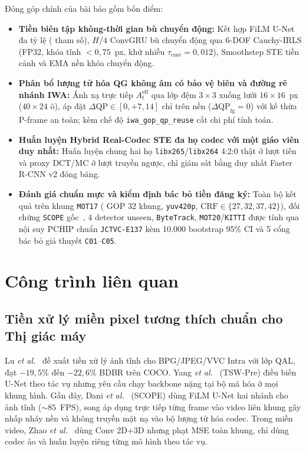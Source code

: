 \documentclass[journal]{IEEEtran}
\begin{document}
Đóng góp chính của bài báo gồm bốn điểm:
\begin{itemize}
    \item \textbf{Tiền biên tập không-thời gian bù chuyển động:} Kết hợp FiLM U-Net đa tỷ lệ (\tscopeTotalParams{} tham số), $H/4$ ConvGRU bù chuyển động qua 6-DOF Cauchy-IRLS (FP32, khóa tĩnh $<0{,}75$~px, khử nhiễu $\tau_{\mathrm{core}}=0{,}012$), Smoothstep STE tiền cảnh và EMA nền khóa chuyển động.
    \item \textbf{Phân bổ lượng tử hóa QG không âm có bảo vệ biên và đường rẽ nhánh IWA:} Ánh xạ trực tiếp $A_t^{\mathrm{eff}}$ qua lớp đệm $3\times 3$ xuống lưới $16\times 16$~px ($40\times 24$ ô), áp đặt $\Delta\mathrm{QP} \in [0, +7{,}14]$ chỉ trên nền ($\Delta\mathrm{QP}_{\mathrm{fg}}=0$) với kế thừa P-frame an toàn; kèm chế độ \texttt{iwa\_gop\_qp\_reuse} cắt \tscopeIwaAnalyticalGmacSaving{} chi phí tính toán.
    \item \textbf{Huấn luyện Hybrid Real-Codec STE đa họ codec với một giáo viên duy nhất:} Huấn luyện chung hai họ \texttt{libx265}/\texttt{libx264} 4:2:0 thật ở lượt tiến và proxy DCT/MC ở lượt truyền ngược, chỉ giám sát bằng duy nhất Faster R-CNN v2 đóng băng.
    \item \textbf{Đánh giá chuẩn mực và kiểm định bác bỏ tiền đăng ký:} Toàn bộ kết quả trên \tscopeEvalFrames{} khung \texttt{MOT17} (\tscopeEvalClips{} GOP 32 khung, \texttt{yuv420p}, $\mathrm{CRF}\in\{27,32,37,42\}$), đối chứng \texttt{SCOPE} gốc~\cite{dani2026scope}, 4 detector unseen, \texttt{ByteTrack}, \texttt{MOT20}/\texttt{KITTI} được tính qua nội suy PCHIP chuẩn \texttt{JCTVC-E137} kèm 10.000 bootstrap 95\% CI và 5 cổng bác bỏ giả thuyết \texttt{C01}--\texttt{C05}.
\end{itemize}

\section{Công trình liên quan}
\label{sec:related}

\subsection{Tiền xử lý miền pixel tương thích chuẩn cho Thị giác máy}
Lu \textit{et al.}~\cite{lu2024preprocessing} đề xuất tiền xử lý ảnh tĩnh cho BPG/JPEG/VVC Intra với lớp QAL, đạt $-19{,}5\%$ đến $-22{,}6\%$ BDBR trên COCO. Yang \textit{et al.}~\cite{yang2024task} (TSW-Pre) điều biến U-Net theo tác vụ nhưng yêu cầu chạy backbone nặng tại bộ mã hóa ở mọi khung hình. Gần đây, Dani \textit{et al.}~\cite{dani2026scope} (SCOPE) dùng FiLM U-Net hai nhánh cho ảnh tĩnh ($\sim 85$~FPS), song áp dụng trực tiếp từng frame vào video liên khung gây nhấp nháy nền và không truyền mặt nạ vào bộ lượng tử hóa codec. Trong miền video, Zhao \textit{et al.}~\cite{zhao2024preprocessing} dùng Conv 2D+3D nhưng phạt MSE toàn khung, chỉ dùng codec ảo và huấn luyện riêng từng mô hình theo tác vụ.
\end{document}
